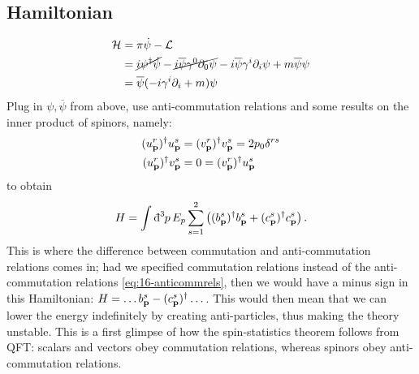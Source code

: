\subsection*{Hamiltonian}%

\begin{align}
  \mathcal{H} &= \pi \dot{\psi} - \mathcal{L} \\
 &= \cancel{i \psi^{\dagger} \dot{\psi}} - \cancel{i \overline{\psi} \gamma^0 \partial_0 \psi} - i \overline{\psi} \gamma^{i} \partial_{i} \psi + m \overline{\psi} \psi \\
 &= \overline{\psi} (-i \gamma^{i} \partial_{i} + m) \psi
\end{align}
Plug in $\psi, \overline{\psi}$ from above, use anti-commutation relations and some results on the inner product of spinors, namely:
\begin{subequations}
  \begin{align}
    (u_{\vb{p}}^{r})^{\dagger} u_{\vb{p}}^{s} &= (v_{\vb{p}}^{r})^{\dagger} v_{\vb{p}}^{s} = 2 p_0 \delta^{rs} \\
    (u_{\vb{p}}^{r})^{\dagger} v_{\vb{p}}^{s} &= 0 = (v_{\vb{p}}^{r})^{\dagger} u_{\vb{p}}^{s}
  \end{align}
\end{subequations}
to obtain
\begin{equation}
  H = \int \bdd[3]{p} E_p \sum_{s=1}^{2} \left( (b_{\vb{p}}^{s})^{\dagger} b^{s}_{\vb{p}} + (c_{\vb{p}}^{s})^{\dagger} c^{s}_{\vb{p}} \right).
\end{equation}
This is where the difference between commutation and anti-commutation relations comes in; had we specified commutation relations instead of the anti-commutation relations \eqref{eq:16-anticommrels}, then we would have a minus sign in this Hamiltonian: $H= \dots b_{\vb{p}}^{s} - (c_{\vb{p}}^{s})^{\dagger} \dots$.
This would then mean that we can lower the energy indefinitely by creating anti-particles, thus making the theory unstable.
This is a first glimpse of how the spin-statistics theorem follows from QFT: scalars and vectors obey commutation relations, whereas spinors obey anti-commutation relations.
